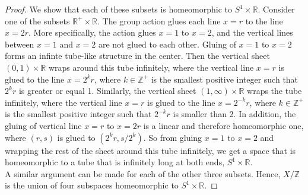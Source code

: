 \documentclass{article}
\begin{document}
\begin{enumerate}
\begin{enumerate}
\begin{proof}
          We show that each of these subsets is homeomorphic to
          $S^1\times\mathbb{R}$. Consider one of the subsets
          $\mathbb{R}^+\times\mathbb{R}$. The group action glues each line
          $x=r$ to the line $x=2r$. More specifically, the action glues
          $x=1$ to $x=2$, and the vertical lines between $x=1$ and $x=2$
          are not glued to each other. Gluing of $x=1$ to $x=2$ forms an
          infinte tube-like structure in the center. Then the vertical sheet
          $(0,1)\times\mathbb{R}$ wraps around this tube infinitely, where
          the vertical line $x=r$ is glued to the line $x=2^kr$, where
          $k\in\mathbb{Z}^+$ is the smallest positive integer such that
          $2^kr$ is greater or equal 1. Similarly, the vertical sheet
          $(1,\infty)\times\mathbb{R}$ wraps the tube infinitely, where the
          vertical line $x=r$ is glued to the line $x=2^{-k}r$, where
          $k\in\mathbb{Z}^+$ is the smallest positive integer such that
          $2^{-k}r$ is smaller than 2. In addition, the gluing of vertical
          line $x=r$ to $x=2r$ is a linear and therefore homeomorphic one,
          where $(r,s)$ is glued to $(2^kr,s/2^k)$. So from gluing $x=1$ to
          $x=2$ and wrapping the rest of the sheet around this tube
          infinitely, we get a space that is homeomorphic to a tube that is
          infinitely long at both ends, $S^1\times\mathbb{R}$. \\

          A similar argument can be made for each of the other three
          subsets. Hence, $X/\mathbb{Z}$ is the union of four subspaces
          homeomorphic to $S^1\times\mathbb{R}$.
        \end{proof}
    \end{enumerate}
\end{enumerate}
\end{document}
